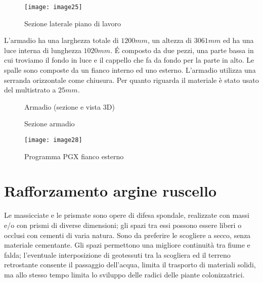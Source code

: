 \begin{figure}[H]
	\centering
	\texttt{[image: image25]}
	\caption{Sezione laterale piano di lavoro}
\end{figure}

\noindent
L'armadio ha una larghezza totale di $1200 mm$, un altezza di $3061 mm$ ed ha  una luce interna di  lunghezza $1020 mm$. É composto da  due pezzi, una parte bassa in cui troviamo il fondo in luce e il cappello che fa da fondo per la parte in alto.   Le spalle sono composte da un fianco interno ed uno esterno. L'armadio utilizza una serranda orizzontale come chiusura. Per quanto riguarda il materiale  è stato usato del multistrato a $25mm$.

\begin{figure}[H]
	\captionsetup[subfloat]{farskip=2pt,captionskip=8pt}
	\centering
	\hspace{1cm}
	
	\caption{Armadio (sezione e vista 3D)}
	\label{fig:imagesizes}
\end{figure}

\begin{figure}[H]
	\captionsetup[subfloat]{farskip=2pt,captionskip=8pt}
	\centering
	\hspace{1cm}
	
	\caption{Sezione armadio}
	\label{fig:imagesizes}
\end{figure}


\begin{figure}[H]
	\centering
	\texttt{[image: image28]}
	\caption{Programma PGX fianco esterno}
	\label{fig:mesh1}
\end{figure}


\newpage
\section{Rafforzamento argine ruscello}

Le massicciate e le prismate sono opere di difesa spondale, realizzate con massi e/o con prismi di diverse dimensioni; gli spazi tra essi possono essere liberi o occlusi con cementi di varia natura. Sono da preferire le scogliere a secco, senza materiale cementante. Gli spazi permettono una migliore continuità tra fiume e falda; l’eventuale interposizione di geotessuti tra la scogliera ed il terreno retrostante consente il passaggio dell'acqua, limita il trasporto di materiali solidi, ma allo stesso tempo limita lo sviluppo delle radici delle piante colonizzatrici. 

